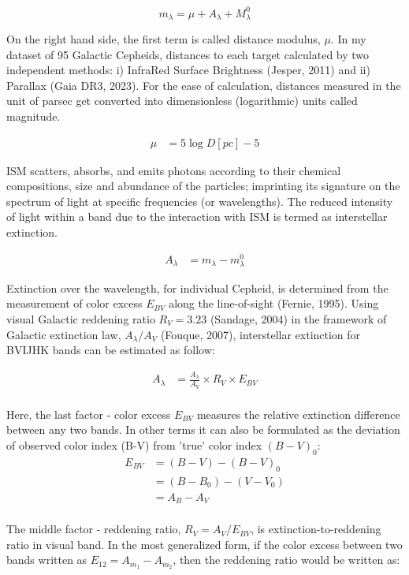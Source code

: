 \documentclass[12pt,a4paper]{article}
\begin{document}
$$ m_\lambda = \mu + A_\lambda +  M_\lambda^0 $$

On the right hand side, the first term is called distance modulus, $\mu$. In my dataset of 95 Galactic Cepheids, distances to each target calculated by two independent methods: i) InfraRed Surface Brightness (Jesper, 2011) and ii) Parallax (Gaia DR3, 2023). For the ease of calculation, distances measured in the unit of parsec get converted into dimensionless (logarithmic) units called magnitude. 

\begin{align*}
	\mu & = 5 \log D [pc] - 5
\end{align*}

ISM scatters, absorbs, and emits photons according to their chemical compositions, size and abundance of the particles; imprinting its signature on the spectrum of light at specific frequencies (or wavelengths). The reduced intensity of light within a band due to the interaction with ISM is termed as interstellar extinction. 

\begin{align*}
	A_\lambda & = m_\lambda - m_\lambda^0
\end{align*}


Extinction over the wavelength, for individual Cepheid, is determined from the measurement of color excess $E_{BV}$ along the line-of-sight (Fernie, 1995). Using visual Galactic reddening ratio $R_V = 3.23$ (Sandage, 2004) in the framework of Galactic extinction law, $A_\lambda/A_V$ (Fouque, 2007), interstellar extinction  for BVIJHK bands can be estimated as follow:

\begin{align*}
A_\lambda & = \frac{A_\lambda}{A_V} \times R_V \times E_{BV} \\
\end{align*}

Here, the last factor - color excess $E_{BV}$ measures the relative extinction difference between any two bands. In other terms it can also be formulated as the deviation of observed color index (B-V) from 'true' color index $(B-V)_0$:
\begin{align*}
E_{BV} & = (B-V) - (B-V)_0 \\
        & = (B-B_0) - (V-V_0) \\
        & = A_B - A_V \\
\end{align*}

The middle factor - reddening ratio, $R_V = A_V/E_{BV}$, is extinction-to-reddening ratio in visual band. In the most generalized form, if the color excess between two bands written as $E_{12} = A_{m_1} - A_{m_2}$, then the reddening ratio would be written as:
\end{document}
